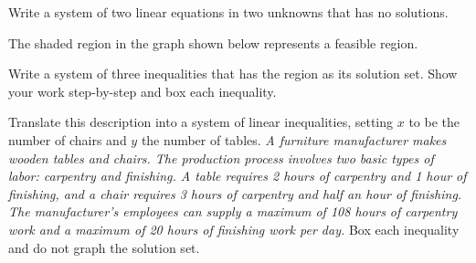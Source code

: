 \documentclass[11pt,answers]{exam}
\begin{document}
\begin{questions}


\addpoints

\bonusquestion[1]  Write a system of two linear equations in two unknowns that has no solutions.

\fillwithdottedlines{2cm}



\question[4] 

The shaded region in the graph shown below represents a feasible region.

\begin{minipage}{0.5\linewidth}
\end{minipage}
\begin{minipage}{0.5\linewidth}
 Write a system of three inequalities that has the region as its solution set. Show your work step-by-step and box each inequality.
\fillwithdottedlines{0.25\textheight}
\end{minipage}



\fillwithdottedlines{3cm}
\question[4] Translate this description into a system of linear inequalities, setting $x$ to be the number of chairs and $y$ the number of tables. {\em{A furniture manufacturer makes wooden tables and chairs. The production process involves two basic types of labor: carpentry and finishing. A table requires 2 hours of carpentry and 1 hour of finishing, and a chair requires 3 hours of carpentry and half an hour of finishing. The manufacturer's employees can supply a maximum of 108 hours of carpentry work and a maximum of 20 hours of finishing work per day.}} Box each inequality and do not graph the solution set.
\fillwithdottedlines{3.5cm}





\end{questions}
\end{document}
